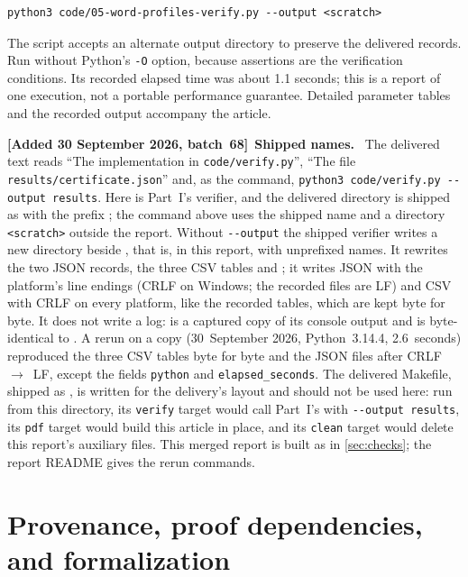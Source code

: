 \documentclass[11pt,letterpaper]{article}
\numberwithin{equation}{section}
\theoremstyle{definition}
\theoremstyle{remark}
\theoremstyle{definition}
\newenvironment{writenotee}[1][]{\par\smallskip\begingroup\small\sloppy
 \noindent\textbf{[Added 30 September 2026, batch~68]}\if\relax\detokenize{#1}\relax\else~\textbf{#1.}\fi\ }%
 {\par\endgroup\smallskip}
\begin{document}
\begin{lstlisting}
python3 code/05-word-profiles-verify.py --output <scratch>
\end{lstlisting}

The script accepts an alternate output directory to preserve the delivered
records. Run without Python's \texttt{-O} option, because assertions are the
verification conditions. Its recorded elapsed time was about 1.1 seconds;
this is a report of one execution, not a portable performance guarantee.
Detailed parameter tables and the recorded output accompany the article.

\begin{writenotee}[Shipped names]
The delivered text reads ``The implementation in \texttt{code/verify.py}'',
``The file \texttt{results/certificate.json}'' and, as the command,
\texttt{python3 code/verify.py -{}-output results}. Here
 is Part~I's verifier, and the delivered
 directory is shipped as  with the prefix
; the command above uses the shipped name and a
directory \texttt{<scratch>} outside the report. Without
\texttt{-{}-output} the shipped verifier writes a new 
directory beside , that is, in this report, with unprefixed
names. It rewrites the two JSON records, the three CSV tables and
; it writes JSON with the platform's line endings
(CRLF on Windows; the recorded files are LF) and CSV with CRLF on every
platform, like the recorded tables, which are kept byte for byte. It does
not write a log:  is a
captured copy of its console output and is byte-identical to
. A rerun on a copy
(30~September 2026, Python~3.14.4, 2.6~seconds) reproduced the three CSV
tables byte for byte and the JSON files after CRLF~$\to$~LF, except the
fields \texttt{python} and \texttt{elapsed\_seconds}. The delivered
Makefile, shipped as , is written for
the delivery's layout and should not be used here: run from this
directory, its \texttt{verify} target would call Part~I's
 with \texttt{-{}-output results}, its \texttt{pdf}
target would build this article in place, and its \texttt{clean} target
would delete this report's auxiliary files. This merged report is built as
in \cref{sec:checks}; the report README gives the rerun commands.
\end{writenotee}

\section{Provenance, proof dependencies, and formalization}\label{uw:sec:source-audit}
\end{document}
